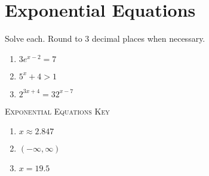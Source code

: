 \chapter{Exponential Equations}

Solve each. Round to 3 decimal places when necessary.
\begin{enumerate}
	\item $3e^{x-2} = 7$
	\item $5^x + 4 > 1$
	\item $2^{3x+4} = 32^{x-7}$
\end{enumerate}

\newpage

\textsc{Exponential Equations Key}

\begin{enumerate}
	\item $x \approx 2.847$
	\item $(-\infty, \infty)$
	\item $x = 19.5$
\end{enumerate}